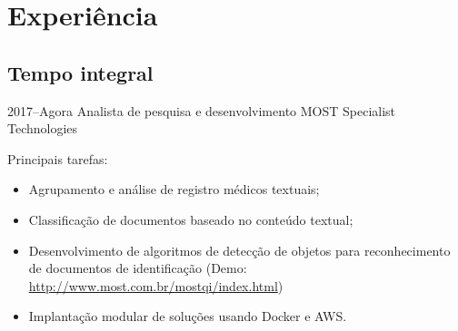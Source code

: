 \documentclass[a4paper]{cv-friggeri-x}
\begin{document}




\section{Experiência}

\subsection{Tempo integral}

\begin{entrylist}


\entry
    {2017--Agora}
    {Analista de pesquisa e desenvolvimento}
    {MOST Specialist Technologies}
    {Principais tarefas:
    \begin{itemize}
        \item Agrupamento e análise de registro médicos textuais;
        \item Classificação de documentos baseado no conteúdo textual;
        \item Desenvolvimento de algoritmos de detecção de objetos para reconhecimento de documentos de identificação (Demo: \href{http://www.most.com.br/mostqi/index.html}{http://www.most.com.br/mostqi/index.html})
        \item Implantação modular de soluções usando Docker e AWS.
    \end{itemize}}


\end{entrylist}
\end{document}
